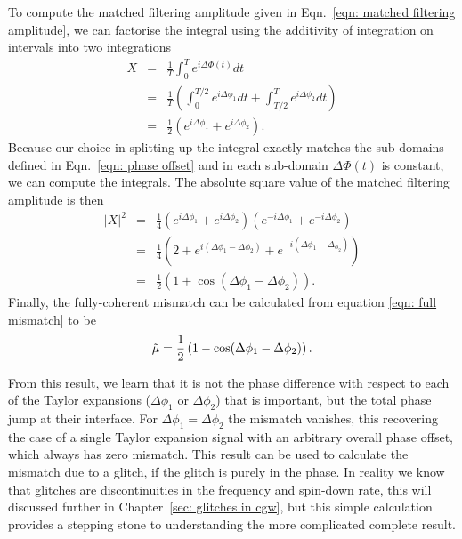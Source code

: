 \documentclass[../full_thesis/full_thesis.tex]{subfiles}
\begin{document}
To compute the matched filtering amplitude given in Eqn.~\eqref{eqn: matched
filtering amplitude}, we can factorise the integral using the additivity of
integration on intervals into two integrations
\begin{eqnarray}
X & = &\frac{1}{T } \int_{0}^{T}e^{i\Delta\Phi(t)} dt\\
 & = &\frac{1}{T }\left(\int_{0}^{T /2}e^{i\Delta\phi_{1}} dt  +
\int_{T/2}^{T} e^{i\Delta\phi_{2}}dt\right)\\
& = & \frac{1}{2}\left(e^{i\Delta\phi_{1}} + e^{i\Delta\phi_{2}}\right).
\end{eqnarray}
Because our choice in splitting up the integral exactly matches the sub-domains
defined in Eqn.~\eqref{eqn: phase offset} and in each sub-domain $\Delta\Phi(t)$
is constant, we can compute the integrals.
The absolute square value of the matched filtering amplitude is then
\begin{eqnarray}
|X|^{2}& = &\frac{1}{4}\left(e^{i\Delta\phi_{1}} + e^{i\Delta\phi_{2}}\right) \left(e^{-i\Delta\phi_{1}} + e^{-i\Delta\phi_{2}}\right)\\
& = &\frac{1}{4} \left(2 + e^{i(\Delta\phi_{1} - \Delta \phi_{2})} +  e^{-i(\Delta\phi_{1} - \Delta_{\phi_{2}})} \right) \\
& = &\frac{1}{2}\left(1 + \cos(\Delta\phi_{1} - \Delta\phi_{2})\right).
\end{eqnarray}
Finally, the fully-coherent mismatch can be calculated from equation \eqref{eqn: full mismatch}
to be
\begin{equation}
\tilde{\mu} = \frac{1}{2}\left(1 - \cos(\Delta\phi_{1} - \Delta\phi_{2})\right).
\label{eqn: two segment phase mismatch}
\end{equation}

From this result, we learn that it is not the phase difference with respect to
each of the Taylor expansions ($\Delta\phi_1$ or $\Delta\phi_2$) that is
important, but the total phase jump at their interface. For $\Delta \phi_{1} =
\Delta \phi_{2}$ the mismatch vanishes, this recovering the case of a single
Taylor expansion signal with an arbitrary overall phase offset, which always has
zero mismatch. This result can be used to calculate the mismatch due to a glitch,
if the glitch is purely in the phase. In reality we know that glitches are
discontinuities in the frequency and spin-down rate, this will discussed further
in Chapter~\ref{sec: glitches in cgw}, but this simple calculation provides
a stepping stone to understanding the more complicated complete result.
\end{document}
